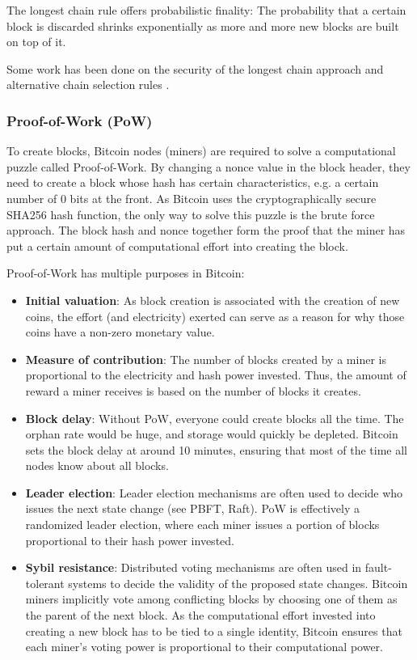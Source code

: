 \documentclass[12pt]{article}
\begin{document}
    The longest chain rule offers probabilistic finality: The probability that a certain block is discarded shrinks exponentially as more and more new blocks are built on top of it.
    
Some work has been done on the security of the longest chain approach and alternative chain selection rules \cite{GHOST}.

\subsubsection{Proof-of-Work (PoW)}

    To create blocks, Bitcoin nodes (miners) are required to solve a computational puzzle called Proof-of-Work. By changing a nonce value in the block header, they need to create a block whose hash has certain characteristics, e.g. a certain number of 0 bits at the front. As Bitcoin uses the cryptographically secure SHA256 hash function, the only way to solve this puzzle is the brute force approach. The block hash and nonce together form the proof that the miner has put a certain amount of computational effort into creating the block.

Proof-of-Work has multiple purposes in Bitcoin:
\begin{itemize}
    \item \textbf{Initial valuation}: As block creation is associated with the creation of new coins, the effort (and electricity) exerted can serve as a reason for why those coins have a non-zero monetary value.
    \item \textbf{Measure of contribution}: The number of blocks created by a miner is proportional to the electricity and hash power invested. Thus, the amount of reward a miner receives is based on the number of blocks it creates.
    \item \textbf{Block delay}: Without PoW, everyone could create blocks all the time. The orphan rate would be huge, and storage would quickly be depleted. Bitcoin sets the block delay at around 10 minutes, ensuring that most of the time all nodes know about all blocks.
    \item \textbf{Leader election}: Leader election mechanisms are often used to decide who issues the next state change (see PBFT, Raft). PoW is effectively a randomized leader election, where each miner issues a portion of blocks proportional to their hash power invested.
    \item \textbf{Sybil resistance}: Distributed voting mechanisms are often used in fault-tolerant systems to decide the validity of the proposed state changes. Bitcoin miners implicitly vote among conflicting blocks by choosing one of them as the parent of the next block. As the computational effort invested into creating a new block has to be tied to a single identity, Bitcoin ensures that each miner's voting power is proportional to their computational power.
\end{itemize}
\end{document}
